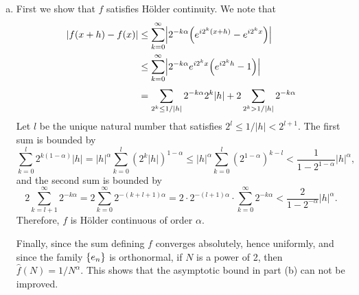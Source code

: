 \begin{exrc}[15]
\begin{soln}
\begin{enumerate}[(a)]
    \item
        First we show that \(f\) satisfies Hölder continuity.
        We note that
        \begin{align*}
            |f(x + h) - f(x)|
            &\leq \sum_{k = 0}^{\infty} \abs{2^{-k\alpha} \lrb{e^{i 2^k (x + h)} - e^{i 2^k x}}} \\
            &\leq \sum_{k = 0}^{\infty} \abs{2^{-k\alpha} e^{i 2^k x} \lrb{e^{i 2^k h} - 1}} \\
            &= \sum_{2^k \leq 1 / |h|}^{} 2^{-k \alpha} 2^k |h|
            + 2\sum_{2^k > 1 / |h|}^{} 2^{-k \alpha}
        \end{align*}
        Let \(l\) be the unique natural number that satisfies \(2^l \leq 1 / |h| < 2^{l + 1}\).
        The first sum is bounded by
        \begin{equation*}
            \sum_{k = 0}^{l} 2^{k(1 - \alpha)} |h|
            = |h|^\alpha \sum_{k = 0}^{l} (2^{k} |h|)^{1 - \alpha}
            \leq |h|^\alpha \sum_{k = 0}^{l} (2^{1 - \alpha})^{k - l}
            < \frac{1}{1 - 2^{1 - \alpha}} |h|^\alpha,
        \end{equation*}
        and the second sum is bounded by 
        \begin{equation*}
            2\sum_{k = l + 1}^{\infty} 2^{-k \alpha}
            = 2 \sum_{k = 0}^{\infty} 2^{-(k + l + 1)\alpha}
            = 2 \cdot 2^{-(l + 1)\alpha} \cdot \sum_{k = 0}^{\infty} 2^{-k\alpha}
            < \frac{2}{1 - 2^{-\alpha}} |h|^\alpha.
        \end{equation*}
        Therefore, \(f\) is Hölder continuous of order \(\alpha\).

        Finally, since the sum defining \(f\) converges absolutely, hence uniformly,
        and since the family \(\set{e_n}\) is orthonormal,
        if \(N\) is a power of 2, then
        \(\hat{f}(N) = 1 / N^{\alpha}\).
        This shows that the asymptotic bound in part (b) can not be improved.


    \end{enumerate}

\end{soln}
\end{exrc}
